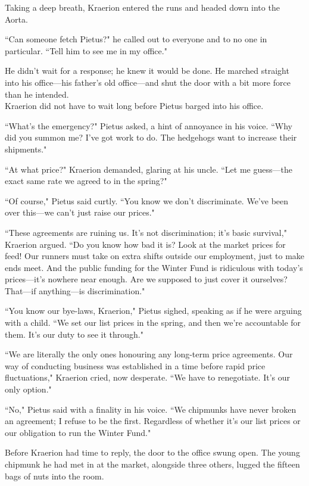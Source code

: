 Taking a deep breath, Kraerion entered the runs and headed down into the Aorta.

``Can someone fetch Pietus?" he called out to everyone and to no one in particular.
``Tell him to see me in my office."

He didn't wait for a response; he knew it would be done.
He marched straight into his office---his father's old office---and shut the door with a bit more force than he intended.\\

Kraerion did not have to wait long before Pietus barged into his office.

``What's the emergency?" Pietus asked, a hint of annoyance in his voice.
``Why did you summon me?
I've got work to do.
The hedgehogs want to increase their shipments."

``At what price?" Kraerion demanded, glaring at his uncle.
``Let me guess---the exact same rate we agreed to in the spring?"

``Of course," Pietus said curtly.
``You know we don't discriminate.
We've been over this---we can't just raise our prices."

``These agreements are ruining us.
It's not discrimination; it's basic survival," Kraerion argued.
``Do you know how bad it is?
Look at the market prices for feed!
Our runners must take on extra shifts outside our employment, just to make ends meet.
And the public funding for the Winter Fund is ridiculous with today's prices---it's nowhere near enough.
Are we supposed to just cover it ourselves?
That---if anything---is discrimination."

``You know our bye-laws, Kraerion," Pietus sighed, speaking as if he were arguing with a child.
``We set our list prices in the spring, and then we're accountable for them.
It's our duty to see it through."

``We are literally the only ones honouring any long-term price agreements.
Our way of conducting business was established in a time before rapid price fluctuations," Kraerion cried, now desperate.
``We have to renegotiate.
It's our only option."

``No," Pietus said with a finality in his voice.
``We chipmunks have never broken an agreement; I refuse to be the first.
Regardless of whether it's our list prices or our obligation to run the Winter Fund."

Before Kraerion had time to reply, the door to the office swung open.
The young chipmunk he had met in at the market, alongside three others, lugged the fifteen bags of nuts into the room.

